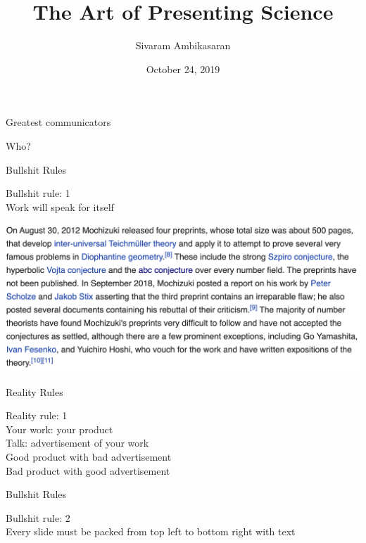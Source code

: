 \documentclass{beamer}
\title[\color{white}The Art of Presenting Science]{\Huge The Art of Presenting Science}
\date[\color{white}October 24, 2019]{October 24, 2019}
\author[\color{white}Sivaram Ambikasaran]{Sivaram Ambikasaran}
\newcommand{\BS}[1]{\Huge{Bullshit rule: #1}\\}
\newcommand{\RR}[1]{\color{white}\Huge{Reality rule: #1}\\}
\newcommand{\BBS}{Bullshit Rules}
\newcommand{\RRS}{\color{white}Reality Rules}
\begin{document}
\frame{\titlepage}

\begin{frame}{\color{white}Greatest communicators}
	\begin{center}
		\color{white}\Huge{Who?}
	\end{center}
\end{frame}

\begin{frame}{\BBS}
	\begin{center}
		\BS{1}
		\Huge{Work will speak for itself}
	\end{center}
\end{frame}

\begin{frame}
	\includegraphics[width=\textwidth]{./Mochizuki.png}
\end{frame}

\begin{frame}{\RRS}
	\begin{center}
		\RR{1}
		\Huge{Your work: your product}\\
		\Huge{Talk: advertisement of your work}\\
		\LARGE{Good product with bad advertisement \frownie{}}\\
		\LARGE{Bad product with good advertisement \frownie{}}\\
	\end{center}
\end{frame}

\begin{frame}{\BBS}
	\begin{center}
		\BS{2}
		\Huge{Every slide must be packed from top left to bottom right with text}
	\end{center}
\end{frame}
\end{document}
